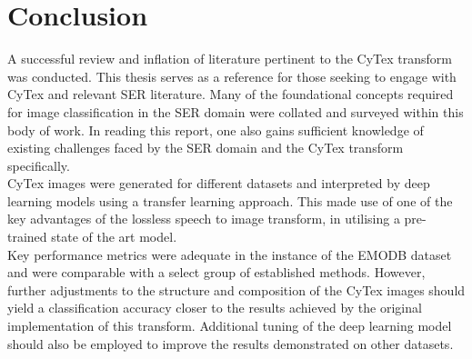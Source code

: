 \section{Conclusion}
A successful review and inflation of literature pertinent to the CyTex transform was conducted. This thesis serves as a reference for those seeking to engage with CyTex and relevant SER literature. Many of the foundational concepts required for image classification in the SER domain were collated and surveyed within this body of work. In reading this report, one also gains sufficient knowledge of existing challenges faced by the SER domain and the CyTex transform specifically.\\
CyTex images were generated for different datasets and interpreted by deep learning models using a transfer learning approach. This made use of one of the key advantages of the lossless speech to image transform, in utilising a pre-trained state of the art model.\\
Key performance metrics were adequate in the instance of the EMODB dataset and were comparable with a select group of established methods. However, further adjustments to the structure and composition of the CyTex images should yield a classification accuracy closer to the results achieved by the original implementation of this transform. Additional tuning of the deep learning model should also be employed to improve the results demonstrated on other datasets.


